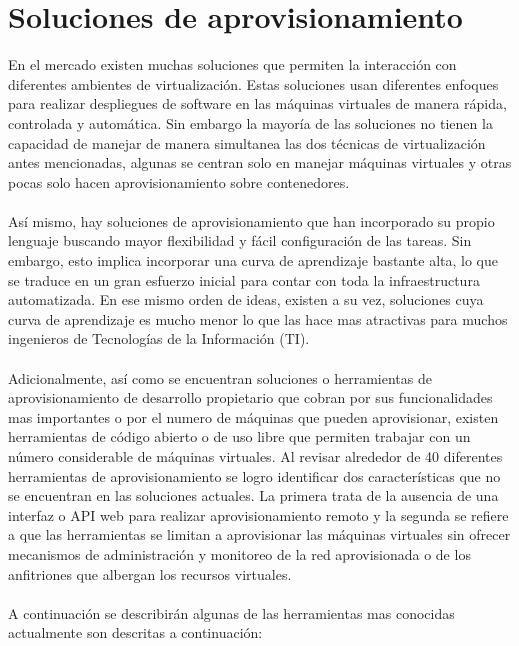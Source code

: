 \section{Soluciones de aprovisionamiento}
En el mercado existen muchas soluciones que permiten la interacción con diferentes ambientes de virtualización. Estas soluciones usan diferentes enfoques para realizar despliegues de software en las máquinas virtuales de manera rápida, controlada y automática. Sin embargo la mayoría de las soluciones no tienen la capacidad de manejar de manera simultanea las dos técnicas de virtualización antes mencionadas, algunas se centran solo en manejar máquinas virtuales y otras pocas solo hacen aprovisionamiento sobre contenedores.\\
\\
Así mismo, hay soluciones de aprovisionamiento que han incorporado su propio lenguaje buscando mayor flexibilidad y fácil configuración de las tareas. Sin embargo, esto implica incorporar una curva de aprendizaje bastante alta, lo que se traduce en un gran esfuerzo inicial para contar con toda la infraestructura automatizada. En ese mismo orden de ideas, existen a su vez, soluciones cuya curva de aprendizaje es mucho menor lo que las hace mas atractivas para muchos ingenieros de Tecnologías de la Información (TI).\\
\\
Adicionalmente, así como se encuentran soluciones o herramientas de aprovisionamiento de desarrollo propietario que cobran por sus funcionalidades mas importantes o por el numero de máquinas que pueden aprovisionar, existen herramientas de código abierto o de uso libre que permiten trabajar con un número considerable de máquinas virtuales. Al revisar alrededor de 40 diferentes herramientas de aprovisionamiento se logro identificar dos características que no se encuentran en las soluciones actuales. La primera trata de la ausencia de una interfaz o API web para realizar aprovisionamiento remoto y la segunda se refiere a que las herramientas se limitan a aprovisionar las máquinas virtuales sin ofrecer mecanismos de administración y monitoreo de la red aprovisionada o de los anfitriones que albergan los recursos virtuales.\\
\\
A continuación se describirán algunas de las herramientas mas conocidas actualmente son descritas a continuación:

